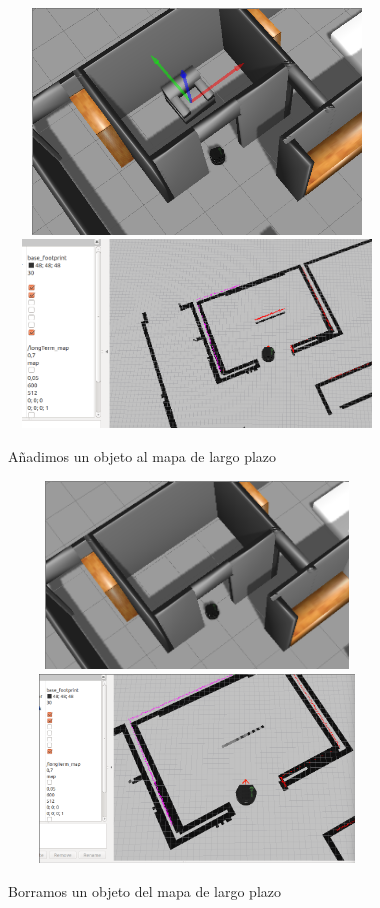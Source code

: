 \begin{figure}[H]
  \begin{center}
    \includegraphics[width=10cm,height=6cm]{img/cap5/addingobject-gazebo}
    \includegraphics[width=10cm,height=5cm]{img/cap5/addingobject-longmap}
  \end{center}
  \caption{Añadimos un objeto al mapa de largo plazo}
  \label{fig:addobjectlongmap}
\end{figure}

\begin{figure}[H]
  \begin{center}
    \includegraphics[width=10cm,height=5cm]{img/cap5/deletingobject-gazebo}
    \includegraphics[width=10cm,height=5cm]{img/cap5/deletingobject-longmap}
  \end{center}
  \caption{Borramos un objeto del mapa de largo plazo}
  \label{fig:deleteobjectlongmap}
\end{figure}




